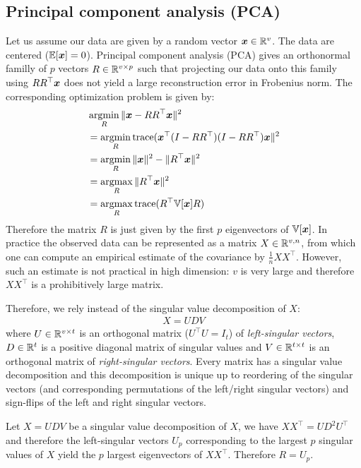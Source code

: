 \subsection{Principal component analysis (PCA)}
Let us assume our data are given by a random vector $\boldsymbol{x} \in \mathbb{R}^{v}$. The data
are centered ($\mathbb{E}[\boldsymbol{x}] = 0$). Principal component analysis (PCA) gives an orthonormal familly of $p$ vectors $R \in \mathbb{R}^{v \times p}$ such that projecting our data onto this family
using $R R^{\top} \boldsymbol{x}$ does not yield a large reconstruction error in Frobenius
norm.
The corresponding optimization problem is given by:
\begin{align}
  &\operatorname*{argmin}_{R} \|\boldsymbol{x} - R R^{\top} \boldsymbol{x} \|^2 \\
  &=\operatorname*{argmin}_{R} {\mathrm{ trace}}(  \boldsymbol{x}^{\top}(I - R R^{\top}) (I - R R^{\top}) \boldsymbol{x}\|^2 \\
  &= \operatorname*{argmin}_{R} \|\boldsymbol{x} \|^2 - \|R^{\top} \boldsymbol{x} \|^2 \\
  &= \operatorname*{argmax}_{R} \|R^{\top} \boldsymbol{x} \|^2 \\
  &= \operatorname*{argmax}_{R} {\mathrm{ trace}}(R^{\top} \mathbb{V}[\boldsymbol{x}] R)
\end{align}
Therefore the matrix $R$ is just given by the first $p$ eigenvectors of
$\mathbb{V}[\boldsymbol{x}]$. In practice the observed data can be represented as a matrix $X \in \mathbb{R}^{v, n}$,
from which one can compute an empirical estimate of the covariance by $\frac1{n}X X^{\top}$.
%
However, such an estimate is not practical in high dimension: $v$ is very
large and therefore $XX^{\top}$ is a prohibitively large matrix.

Therefore, we rely instead of the singular value decomposition of $X$:
\begin{align}
X= U D V
\end{align}
  where $U \in \mathbb{R}^{v \times t}$ is an orthogonal matrix ($U^{\top} U
= I_t$) of
\emph{left-singular vectors}, $D \in \mathbb{R}^{t}$ is a positive diagonal matrix of
singular values and $V \in \mathbb{R}^{t \times t}$ is an orthogonal matrix of
\emph{right-singular vectors}.
%
Every matrix has a singular value decomposition and this
decomposition is unique up to reordering of the singular vectors (and
corresponding permutations of the left/right singular vectors) and sign-flips of
the left and right singular vectors.

Let $X = UDV$ be a singular value decomposition of $X$, we have $XX^{\top}= U
D^2 U^{\top}$ and therefore the left-singular vectors $U_p$ corresponding to the
largest $p$ singular values of $X$ yield  the $p$ largest eigenvectors of
$XX^{\top}$.
Therefore $R = U_p$.

